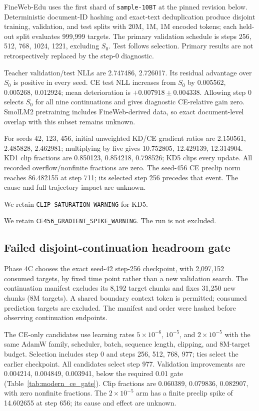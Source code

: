 FineWeb-Edu uses the first shard of \texttt{sample-10BT} at the pinned revision below. Deterministic document-ID hashing and exact-text deduplication produce disjoint training, validation, and test splits with 20M, 1M, 1M encoded tokens; each held-out split evaluates 999,999 targets. The primary validation schedule is steps 256, 512, 768, 1024, 1221, excluding $S_0$. Test follows selection. Primary results are not retrospectively replaced by the step-0 diagnostic.

Teacher validation/test NLLs are 2.747486, 2.726017. Its residual advantage over $S_0$ is positive in every seed. CE test NLL increases from $S_0$ by 0.005562, 0.005268, 0.012924; mean deterioration is $+0.007918\pm0.004338$. Allowing step 0 selects $S_0$ for all nine continuations and gives diagnostic CE-relative gain zero. SmolLM2 pretraining includes FineWeb-derived data, so exact document-level overlap with this subset remains unknown.



For seeds 42, 123, 456, initial unweighted KD/CE gradient ratios are 2.150561, 2.485828, 2.462981; multiplying by five gives 10.752805, 12.429139, 12.314904. KD1 clip fractions are 0.850123, 0.854218, 0.798526; KD5 clips every update. All recorded overflow/nonfinite fractions are zero. The seed-456 CE preclip norm reaches 86.482155 at step 711; its selected step 256 precedes that event. The cause and full trajectory impact are unknown.

We retain \texttt{CLIP\_SATURATION\_WARNING} for KD5.

We retain \texttt{CE456\_GRADIENT\_SPIKE\_WARNING}. The run is not excluded.

\subsection{Failed disjoint-continuation headroom gate}

Phase 4C chooses the exact seed-42 step-256 checkpoint, with 2,097,152 consumed targets, by fixed time point rather than a new validation search. The continuation manifest excludes its 8,192 target chunks and fixes 31,250 new chunks (8M targets). A shared boundary context token is permitted; consumed prediction targets are excluded. The manifest and order were hashed before observing continuation endpoints.

The CE-only candidates use learning rates $5\times10^{-6}$, $10^{-5}$, and $2\times10^{-5}$ with the same AdamW family, scheduler, batch, sequence length, clipping, and 8M-target budget. Selection includes step 0 and steps 256, 512, 768, 977; ties select the earlier checkpoint. All candidates select step 977. Validation improvements are 0.004214, 0.004849, 0.003941, below the required 0.01 gate (Table~\ref{tab:modern_ce_gate}). Clip fractions are 0.060389, 0.079836, 0.082907, with zero nonfinite fractions. The $2\times10^{-5}$ arm has a finite preclip spike of 14.602655 at step 656; its cause and effect are unknown.

